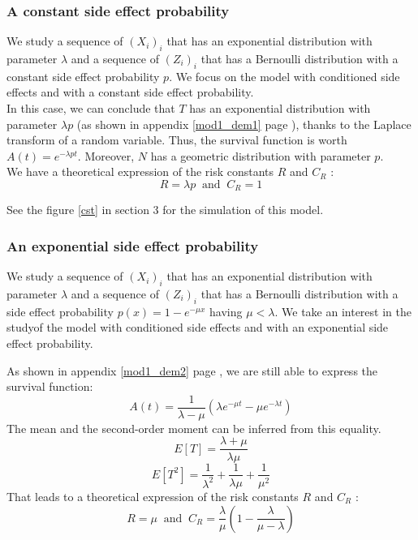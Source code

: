 \documentclass[12pt,twoside]{article}
\begin{document}
\subsubsection{A constant side effect probability}
We study a sequence of $(X_i)_i$ that has an exponential distribution with parameter $\lambda$ and a sequence of $(Z_i)_i$ that has a Bernoulli distribution with a constant side effect probability $p$. We focus on the model with conditioned side effects and with a constant side effect probability.\\

In this case, we can conclude that $T$ has an exponential distribution with 
parameter $\lambda p$ (as shown in appendix \ref{mod1_dem1} page \pageref{mod1_dem1}), thanks to the Laplace transform of a random variable. Thus, the survival 
function is worth $A(t)=e^{-\lambda p t}$. Moreover, $N$ has a geometric distribution with parameter $p$.\\

We have a theoretical expression of the risk constants $R$ and $C_R$ :
\begin{equation}
R=\lambda p ~\textrm{  and  } ~ C_R=1
\label{eq_mod1_exp_cst}
\end{equation}


See the figure \ref{cst} in section 3 for the simulation of this model.


\subsubsection{An exponential side effect probability}
We study a sequence of $(X_i)_i$ that has an exponential distribution with parameter $\lambda$ and a sequence of $(Z_i)_i$ that has a Bernoulli distribution with a side effect probability $p(x)=1-e^{-\mu x}$ having $\mu < \lambda$. We take an interest in the studyof the model with conditioned side effects and with an exponential side effect probability.

As shown in appendix \ref{mod1_dem2} page \pageref{mod1_dem2}, we are still able to express the survival function:
\begin{equation}
A(t)=\frac{1}{\lambda - \mu}(\lambda e^{-\mu t}-\mu e^{-\lambda t})
\label{eq_mod1_exp_exp_1}
\end{equation}
The mean and the second-order moment can be inferred from this equality.
$$E[T]=\frac{\lambda + \mu}{\lambda \mu}$$
$$E[T^2]=\frac{1}{\lambda^2}+\frac{1}{\lambda \mu}+\frac{1}{\mu^2}$$
That leads to a theoretical expression of the risk constants $R$ and $C_R$ :
\begin{equation}
R=\mu ~\textrm{  and  } ~C_R=\frac{\lambda}{\mu}(1-\frac{\lambda}{\mu-\lambda})
\label{eq_mod1_exp_exp_2}
\end{equation}
\end{document}
